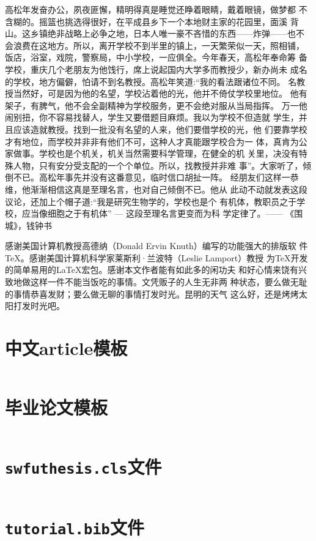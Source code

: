 \documentclass{swfuthesis}
\begin{document}
\begin{advisorInfo}
  高松年发奋办公，夙夜匪懈，精明得真是睡觉还睁着眼睛，戴着眼镜，做梦都
  不含糊的。摇篮也挑选得很好，在平成县乡下一个本地财主家的花园里，面溪
  背山。这乡镇绝非战略上必争之地，日本人唯一豪不吝惜的东西——炸弹——也不
  会浪费在这地方。所以，离开学校不到半里的镇上，一天繁荣似一天，照相铺，
  饭店，浴室，戏院，警察局，中小学校，一应俱全。今年春天，高松年奉命筹
  备学校，重庆几个老朋友为他饯行，席上说起国内大学多而教授少，新办尚未
  成名的学校，地方偏僻，怕请不到名教授。高松年笑道:“我的看法跟诸位不同。
  名教授当然好，可是因为他的名望，学校沾着他的光，他并不倚仗学校里地位。
  他有架子，有脾气，他不会全副精神为学校服务，更不会绝对服从当局指挥。
  万一他闹别扭，你不容易找替人，学生又要借题目麻烦。我以为学校不但造就
  学生，并且应该造就教授。找到一批没有名望的人来，他们要借学校的光，他
  们要靠学校才有地位，而学校并非非有他们不可，这种人才真能跟学校合为一
  体，真肯为公家做事。学校也是个机关，机关当然需要科学管理，在健全的机
  关里，决没有特殊人物，只有安分受支配的一个个单位。所以，找教授并非难
  事”。大家听了，倾倒不已。高松年事先并没有这番意见，临时信口胡扯一阵。
  经朋友们这样一恭维，他渐渐相信这真是至理名言，也对自己倾倒不已。他从
  此动不动就发表这段议论，还加上个帽子道:“我是研究生物学的，学校也是个
  有机体，教职员之于学校，应当像细胞之于有机体” --- 这段至理名言更变而为科
  学定律了。\qquad{}------ 《围城》，钱钟书
\end{advisorInfo}

\begin{acknowledgment} %
  感谢美国计算机教授高德纳（Donald Ervin Knuth）编写的功能强大的排版软
  件\TeX{}。感谢美国计算机科学家莱斯利·兰波特（Leslie Lamport）教授
  为\TeX{}开发的简单易用的\LaTeX{}宏包。感谢本文作者能有如此多的闲功夫
  和好心情来饶有兴致地做这样一件不能当饭吃的事情。文凭贩子的人生无非两
  种状态，要么做无耻的事情恭喜发财；要么做无聊的事情打发时光。昆明的天气
  这么好，还是烤烤太阳打发时光吧。
\end{acknowledgment}

\singlespacing




\chapter{中文article模板}
\label{app:article}

\inputminted{latex}{article.tex}

\chapter{毕业论文模板}
\label{app:thesis}

\inputminted{latex}{thesis-template.tex}

\chapter{\texttt{swfuthesis.cls}文件}
\label{app:class}

\inputminted{latex}{swfuthesis.cls}

\chapter{\texttt{tutorial.bib}文件}
\label{app:bib}

\inputminted{bibtex}{tutorial.bib}
\end{document}
